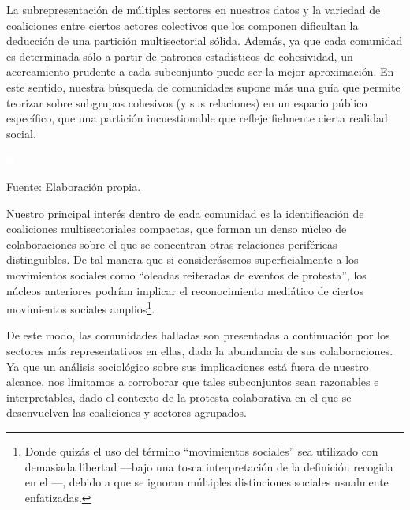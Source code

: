\documentclass[letterpaper, 11pt]{book}
\theoremstyle{definition}
\theoremstyle{remark}
\begin{document}
La subrepresentación de múltiples sectores en nuestros datos y la variedad de coaliciones entre ciertos actores colectivos que los componen dificultan la deducción de una partición multisectorial sólida. 
Además, ya que cada comunidad es determinada sólo a partir de patrones estadísticos de cohesividad, un acercamiento prudente a cada subconjunto puede ser la mejor aproximación. 
En este sentido, nuestra búsqueda de comunidades supone más una guía que permite teorizar sobre subgrupos cohesivos (y sus relaciones) en un espacio público específico, que una partición incuestionable que refleje fielmente cierta realidad social. 



\pagebreak
\begin{minipage}{\linewidth}
\centering
{} \label{4_12_comunidades_red_sectorial}

\includegraphics[scale=0.1]{img/null.png}
\vspace{37em}
\par\bigskip
\small Fuente: Elaboración propia.
\end{minipage}\bigskip



Nuestro principal interés dentro de cada comunidad es la identificación de coaliciones multisectoriales compactas, que forman un denso núcleo de colaboraciones sobre el que se concentran otras relaciones periféricas distinguibles. 
De tal manera que si considerásemos superficialmente a los movimientos sociales como ``oleadas reiteradas de eventos de protesta'', los núcleos anteriores podrían implicar el reconocimiento mediático de ciertos movimientos sociales amplios\footnote{
    Donde quizás el uso del término ``movimientos sociales'' sea utilizado con demasiada libertad ---bajo una tosca interpretación de la definición recogida en el ---, debido a que se ignoran múltiples distinciones sociales usualmente enfatizadas. 
}. 


De este modo, las comunidades halladas son presentadas a continuación por los sectores más representativos en ellas, dada la abundancia de sus colaboraciones. 
Ya que un análisis sociológico sobre sus implicaciones está fuera de nuestro alcance, nos limitamos a corroborar que tales subconjuntos sean razonables e interpretables, dado el contexto de la protesta colaborativa en el que se desenvuelven las coaliciones y sectores agrupados. 
\end{document}
